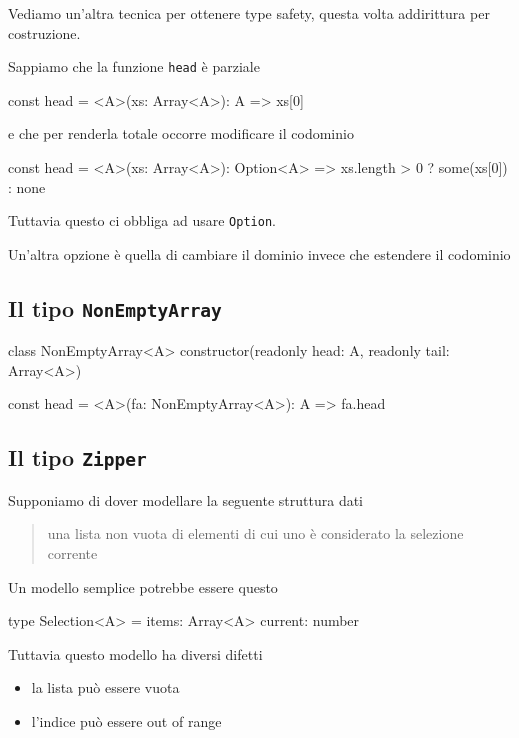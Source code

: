 \documentclass[12pt]{article}
\theoremstyle{definition}
\newenvironment{code}
  {\vspace{0.5cm} \VerbatimEnvironment\begin{typescriptcode}}
  {\end{typescriptcode} \vspace{0.2cm}}
\begin{document}
Vediamo un'altra tecnica per ottenere type safety, questa volta addirittura per costruzione.

Sappiamo che la funzione \texttt{head} è parziale

\begin{code}
const head = <A>(xs: Array<A>): A => xs[0]
\end{code}

e che per renderla totale occorre modificare il codominio

\begin{code}
const head = <A>(xs: Array<A>): Option<A> =>
  xs.length > 0 ? some(xs[0]) : none
\end{code}

Tuttavia questo ci obbliga ad usare \texttt{Option}.

Un'altra opzione è quella di cambiare il dominio invece che estendere il codominio

\subsection{Il tipo \texttt{NonEmptyArray}}

\begin{code}
class NonEmptyArray<A> {
  constructor(readonly head: A, readonly tail: Array<A>) {}
}

const head = <A>(fa: NonEmptyArray<A>): A => fa.head
\end{code}

\subsection{Il tipo \texttt{Zipper}}

Supponiamo di dover modellare la seguente struttura dati

\begin{quote}
una lista non vuota di elementi di cui uno è considerato la selezione corrente
\end{quote}

Un modello semplice potrebbe essere questo

\begin{code}
type Selection<A> = {
  items: Array<A>
  current: number
}
\end{code}

Tuttavia questo modello ha diversi difetti

\begin{itemize}
  \item la lista può essere vuota
  \item l'indice può essere out of range
\end{itemize}
\end{document}
